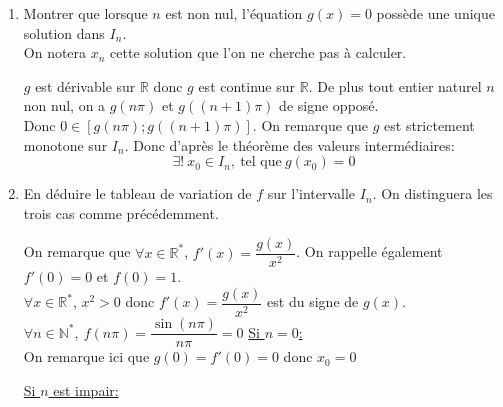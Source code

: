 \documentclass[a4paper,french,bookmarks]{article}
\begin{document}
\begin{enumerate}
\begin{enumerate}
\begin{tcolorbox}[colback=black!3,colframe=black!9,boxrule=.25pt,enhanced,arc is angular,arc=0pt]
    \end{tcolorbox}
    \item Montrer que lorsque $n$ est non nul, l'équation $g(x)=0$ possède une unique solution dans $I_n$.\\On notera $x_n$ cette solution que l'on ne cherche pas à calculer.
        \begin{tcolorbox}[colback=black!3,colframe=black!9,boxrule=.25pt,enhanced,arc is angular,arc=0pt]
        $g$ est dérivable sur $\mathbb{R}$ donc $g$ est continue sur $\mathbb{R}$. De plus tout entier naturel $n$ non nul, on a $g(n\pi)$ et $g((n+1)\pi)$ de signe opposé. \\
        Donc $0 \in \left[g(n\pi);g(\left(n+1\right)\pi)\right]$. On remarque que $g$ est strictement monotone sur $I_n$. Donc d'après le théorème des valeurs intermédiaires:
        \[ \exists! \ x_0 \in I_n, \ \text{tel que} \ g\left(x_0\right) = 0\]
        \end{tcolorbox}
        \newpage
    \item En déduire le tableau de variation de $f$ sur l'intervalle $I_n$. On distinguera les trois cas comme précédemment.
            \begin{tcolorbox}[colback=black!3,colframe=black!9,boxrule=.25pt,enhanced,arc is angular,arc=0pt]
            On remarque que $\forall x \in \mathbb{R}^*$, $f'(x) = \dfrac{g(x)}{x^2}$. On rappelle également $f'(0) = 0$ et $f(0)=1$.\\
            $\forall x \in \mathbb{R}^*$, $x^2 > 0$ donc $f'(x) = \dfrac{g(x)}{x^2}$ est du signe de $g(x)$.
            $\forall n \in \mathbb{N}^*, \ f(n\pi) = \dfrac{\sin\left(n\pi\right)}{n\pi} = 0$
            \underline{Si $n = 0$:}\\
            On remarque ici que $g(0) = f'(0) = 0$ donc $x_0 = 0$\\
            

       \underline{Si $n$ est impair:}\\


\end{tcolorbox}
\end{enumerate}
\end{enumerate}
\end{document}
